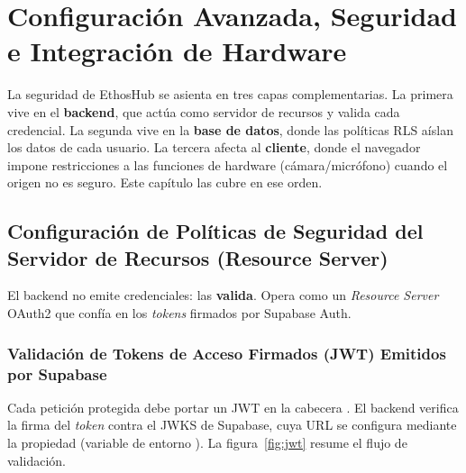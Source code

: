 \chapter[Configuración, Seguridad y Hardware]{Configuración Avanzada, Seguridad e Integración de Hardware}%
\label{ch:seguridad}

La seguridad de EthosHub se asienta en tres capas complementarias. La primera vive en el
\textbf{backend}, que actúa como servidor de recursos y valida cada credencial. La segunda
vive en la \textbf{base de datos}, donde las políticas RLS aíslan los datos de cada
usuario. La tercera afecta al \textbf{cliente}, donde el navegador impone restricciones a
las funciones de hardware (cámara/micrófono) cuando el origen no es seguro. Este capítulo
las cubre en ese orden.\par

\section[Políticas del Servidor de Recursos]{Configuración de Políticas de Seguridad del Servidor de Recursos (Resource Server)}%
\label{sec:resource-server}

El backend no emite credenciales: las \textbf{valida}. Opera como un \textit{Resource
Server} OAuth2 que confía en los \textit{tokens} firmados por Supabase Auth.\par

\subsection[Validación de Tokens JWT de Supabase]{Validación de Tokens de Acceso Firmados (JWT) Emitidos por Supabase}%
\label{subsec:jwt}

Cada petición protegida debe portar un JWT en la cabecera . El backend verifica la firma del \textit{token} contra el JWKS de Supabase, cuya
URL se configura mediante la propiedad  (variable de entorno
). La figura~\ref{fig:jwt} resume el flujo de validación.\par

